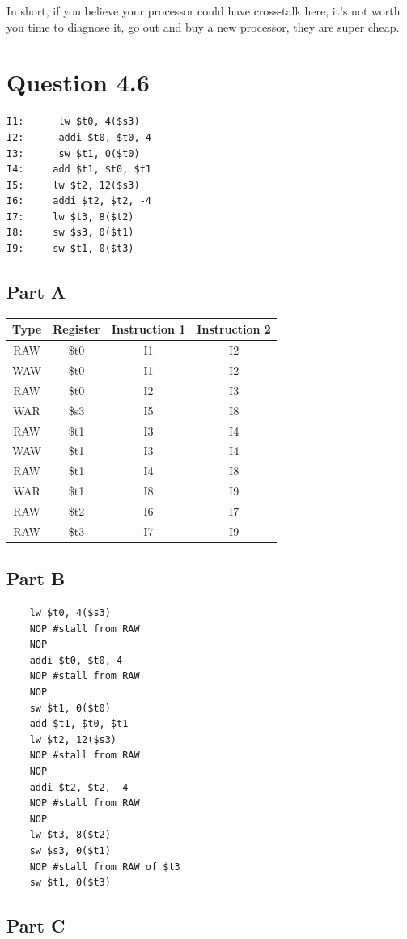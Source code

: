 \documentclass[11pt]{article} %
\begin{document}
In short, if you believe your processor could have cross-talk here, it's not worth you time to diagnose it, go out and buy a new processor, they are super cheap.


\section{Question 4.6}

\begin{verbatim}
I1:      lw $t0, 4($s3)
I2:      addi $t0, $t0, 4
I3:      sw $t1, 0($t0)
I4:     add $t1, $t0, $t1
I5:     lw $t2, 12($s3)
I6:     addi $t2, $t2, -4
I7:     lw $t3, 8($t2)
I8:     sw $s3, 0($t1)
I9:     sw $t1, 0($t3)
\end{verbatim}

\subsection{Part A}

\begin{tabular}{c|c|c|c}
	Type & Register & Instruction 1 & Instruction 2\\\hline
	RAW & \$t0 & I1 & I2 \\
	WAW & \$t0 & I1 & I2 \\
	RAW & \$t0 & I2 & I3 \\
	WAR & \$s3 & I5 & I8 \\
	RAW & \$t1 & I3 & I4 \\
	WAW & \$t1 & I3 & I4 \\
	RAW & \$t1 & I4 & I8 \\
	WAR & \$t1 & I8 & I9 \\
	RAW & \$t2 & I6 & I7 \\
	RAW & \$t3 & I7 & I9 
\end{tabular}

\subsection{Part B}

\begin{verbatim}
    lw $t0, 4($s3)
    NOP #stall from RAW
    NOP
    addi $t0, $t0, 4
    NOP #stall from RAW
    NOP
    sw $t1, 0($t0)
    add $t1, $t0, $t1
    lw $t2, 12($s3)
    NOP #stall from RAW
    NOP
    addi $t2, $t2, -4
    NOP #stall from RAW
    NOP
    lw $t3, 8($t2)
    sw $s3, 0($t1)
    NOP #stall from RAW of $t3
    sw $t1, 0($t3)
\end{verbatim}

\subsection{Part C}
\end{document}

